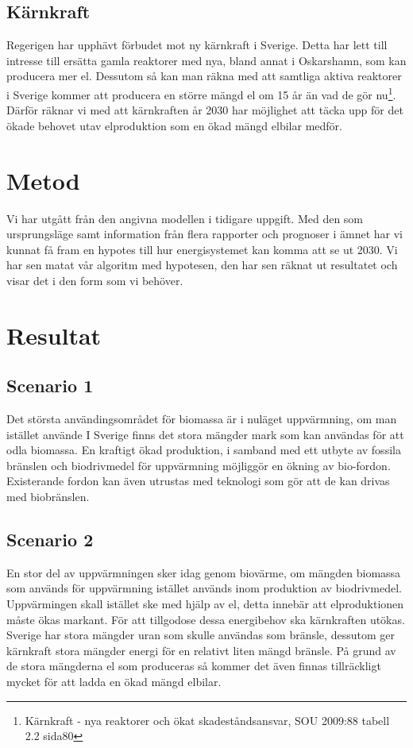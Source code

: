 \documentclass[a4paper,11pt,fleqn, titlepage]{article}
\begin{document}
\subsection{Kärnkraft}
Regerigen har upphävt förbudet mot ny kärnkraft i Sverige. Detta har lett till intresse till ersätta gamla reaktorer med nya, bland annat i Oskarshamn, som kan producera mer el.
Dessutom så kan man räkna med att samtliga aktiva reaktorer i Sverige kommer att producera en större mängd el om 15 år än vad de gör nu\footnote{Kärnkraft - nya reaktorer och ökat skadeståndsansvar, SOU 2009:88  tabell 2.2 sida80}. Därför räknar vi med att kärnkraften år 2030 har möjlighet att täcka upp för det ökade behovet utav elproduktion som en ökad mängd elbilar medför.

\section{Metod}
Vi har utgått från den angivna modellen i tidigare uppgift. Med den som
ursprungsläge samt information från flera rapporter och prognoser i ämnet
har vi kunnat få fram en hypotes till hur energisystemet kan komma att se
ut 2030. Vi har sen matat vår algoritm med hypotesen, den har sen räknat ut
resultatet och visar det i den form som vi behöver.

\section{Resultat}

\subsection{Scenario 1}

Det största användingsområdet för biomassa är i nuläget uppvärmning, om man istället använde
I Sverige finns det stora mängder mark som kan användas för att odla biomassa. En kraftigt ökad produktion, i samband med ett utbyte av fossila bränslen och biodrivmedel för uppvärmning möjliggör en ökning av bio-fordon. Existerande fordon kan även utrustas med teknologi som gör att de kan drivas med biobränslen.

\subsection{Scenario 2}

En stor del av uppvärmningen sker idag genom biovärme, om mängden biomassa som används för uppvärmning istället används inom produktion av biodrivmedel. Uppvärmingen skall istället ske med hjälp av el, detta innebär att elproduktionen måste ökas markant. För att tillgodose dessa energibehov ska kärnkraften utökas. Sverige har stora mängder uran som skulle användas som bränsle, dessutom ger kärnkraft stora mängder energi för en relativt liten mängd bränsle. På grund av de stora mängderna el som produceras så kommer det även finnas tillräckligt mycket för att ladda en ökad mängd elbilar.
\end{document}
